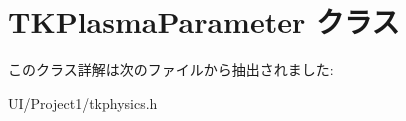 \hypertarget{class_t_k_plasma_parameter}{}\section{T\+K\+Plasma\+Parameter クラス}
\label{class_t_k_plasma_parameter}


このクラス詳解は次のファイルから抽出されました\+:\begin{DoxyCompactItemize}
\item 
U\+I/\+Project1/tkphysics.\+h\end{DoxyCompactItemize}

